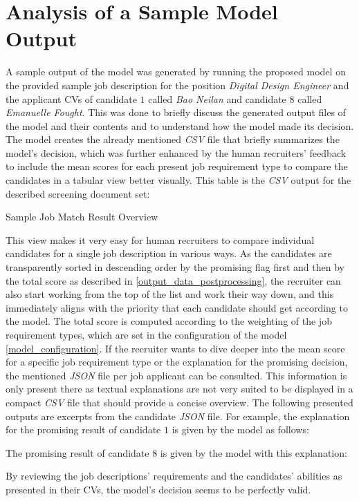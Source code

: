 \documentclass[draft,final]{thesisclass} %
\newcommand{\json}[2]{
    
}
\newcommand{\csv}[3]{
    \begin{table}[H]
        \centering{}
        \resizebox{#3\linewidth}{!}{\csvautotabular[options]{../generated_tables/#1.csv}}
        \caption{#2}
        \label{tab:#1}
    \end{table}
}
\begin{document}
\section{Analysis of a Sample Model Output} \label{analysis_sample_output}
A sample output of the model was generated by running the proposed model on the provided sample job description for the position \textit{Digital Design Engineer} and the applicant \acs{CV}s of candidate $1$ called \textit{Bao Neilan} and candidate $8$ called \textit{Emanuelle Fought}. This was done to briefly discuss the generated output files of the model and their contents and to understand how the model made its decision. The model creates the already mentioned \textit{CSV} file that briefly summarizes the model's decision, which was further enhanced by the human recruiters' feedback to include the mean scores for each present job requirement type to compare the candidates in a tabular view better visually. This table is the \textit{CSV} output for the described screening document set:
\csv{sample_job_match_result}{Sample Job Match Result Overview}{1.0}
This view makes it very easy for human recruiters to compare individual candidates for a single job description in various ways. As the candidates are transparently sorted in descending order by the promising flag first and then by the total score as described in \ref{output_data_postprocessing}, the recruiter can also start working from the top of the list and work their way down, and this immediately aligns with the priority that each candidate should get according to the model. The total score is computed according to the weighting of the job requirement types, which are set in the configuration of the model \ref{model_configuration}. If the recruiter wants to dive deeper into the mean score for a specific job requirement type or the explanation for the promising decision, the mentioned \textit{JSON} file per job applicant can be consulted. This information is only present there as textual explanations are not very suited to be displayed in a compact \textit{CSV} file that should provide a concise overview. The following presented outputs are excerpts from the candidate \textit{JSON} file. For example, the explanation for the promising result of candidate $1$ is given by the model as follows:
\json{candidate_1_promising_result}{Promising Result Explanation for \textit{Bao Neilan}}
The promising result of candidate $8$ is given by the model with this explanation:
\json{candidate_8_promising_result}{Promising Result Explanation for \textit{Emanuelle Fought}}
By reviewing the job descriptions' requirements and the candidates' abilities as presented in their \acs{CV}s, the model's decision seems to be perfectly valid.
\end{document}

